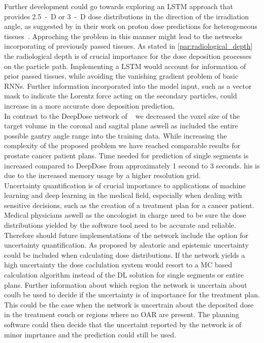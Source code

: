 Further development could go towards exploring an LSTM approach that provides 2.5~-~D or 3~-~D dose distributions in the direction of the irradiation angle, as suggested by \citeauthor{neishabouri_long_2020} in their work on proton dose predictions for heterogeneous tissues~\cite{neishabouri_long_2020}. 
Approching the problem in this manner might lead to the networks incorporating of previously passed tissues.
As stated in \autoref{par:radiological_depth} the radiological depth is of crucial importance for the dose deposition processes on the particle path.
Implementing a LSTM would account for information of prior passed tissues, while avoiding the vanishing gradient problem of basic RNNs. 
Further information incorporated into the model input, such as a vector mask to indicate the Lorentz force acting on the secondary particles, could increase in a more accurate dose deposition prediction.\\
In contrast to the DeepDose network of \citeauthor{kontaxis_deepdose_2020}~\cite{kontaxis_deepdose_2020} we decreased the voxel size of the target volume in the coronal and sagital plane aswell as included the entire possible gantry angle range into the training data.
While increasing the complexity of the proposed problem we have reached comparable results for prostate cancer patient plans.
Time needed for prediction of single segments is increased compared to DeepDose from approximately 1 second to 3 seconds.
his is due to the increased memory usage by a higher resolution grid.\\
Uncertainty quantification is of crucial importance to applications of machine learning and deep learning in the medical field, especially when dealing with sensitive decisions, such as the creation of a treatment plan for a cancer patient.
Medical physicians aswell as the oncologist in charge need to be sure the dose distributions yielded by the software tool need to be accurate and reliable.
Therefore should future implementations of the network include the option for uncertainty quantification.
As proposed by \citeauthor{kendall_what_2017} aleatoric and epistemic uncertainty could be included when calculating dose distributions.
If the network yields a high uncertainty the dose caclulation system would resort to a \acs{MC} based calculation algorithm instead of the \acs{DL} solution for single segments or entire plans.
Further information about which region the network is uncertain about coulb be used to decide if the uncertainty is of importance for the treatment plan.
This could be the case when the network is uncertrain about the deposited dose in the treatment couch or regions where no \acs{OAR} are present.
The planning software could then decide that the uncertaint reported by the network is of minor imprtance and the prediction could still be used.







